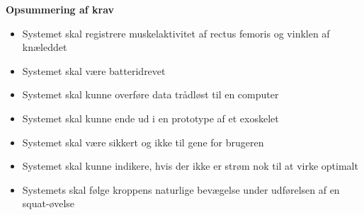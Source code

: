 \textbf{Opsummering af krav}
\begin{itemize}
\item[\text{\sffamily \checkmark}] Systemet skal registrere muskelaktivitet af rectus femoris og vinklen af knæleddet
\item[\text{\sffamily \checkmark}] Systemet skal være batteridrevet
\item[\text{\sffamily \checkmark}] Systemet skal kunne overføre data trådløst til en computer
\item[\text{\sffamily \checkmark}] Systemet skal kunne ende ud i en prototype af et exoskelet
\item[\text{\sffamily \checkmark}] Systemet skal være sikkert og ikke til gene for brugeren 
\item[\text{\sffamily \checkmark}] Systemet skal kunne indikere, hvis der ikke er strøm nok til at virke optimalt
\item[\text{\sffamily \checkmark}] Systemets skal følge kroppens naturlige bevægelse under udførelsen af en squat-øvelse
\end{itemize}
